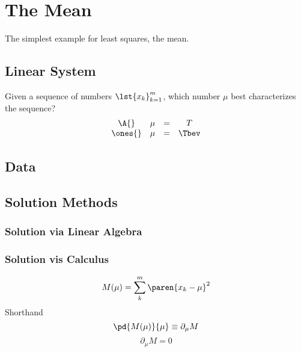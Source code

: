 \chapter{The Mean}

The simplest example for least squares, the mean.

\section{Linear System}  %
Given a sequence of numbers $\lst{x_{k}}_{k=1}^{m}$, which number $\mu$ best characterizes the sequence?
  \begin{equation*}   %
     \begin{array}{cccc}
         \A{} & \mu & = & T \\
         \ones{} & \mu & = & \Tbev
    \end{array}
  \end{equation*}
\section{Data}  %

\section{Solution Methods}  %

\subsection{Solution via Linear Algebra}  %
\subsection{Solution vis Calculus}  %
%
\begin{equation}
    M(\mu) = \sum_{k}^{m} \paren{ x_{k} - \mu }^2
\end{equation}
%
Shorthand
  \begin{equation}   %
    \pd{M(\mu)}{\mu} \equiv \partial_{\mu} M
  \end{equation}
%
\begin{equation}
    \partial_{\mu} M = 0
\end{equation}
%

